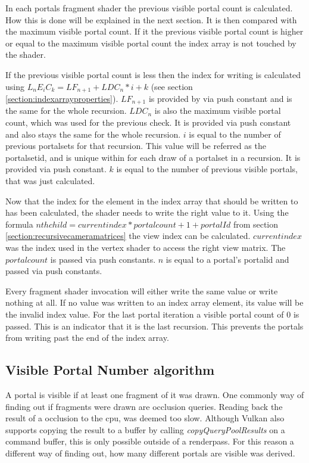 In each portals fragment shader the previous visible portal count is calculated. How this is done will be explained in the next section. It is then compared with the maximum visible portal count. If it the previous visible portal count is higher or equal to the maximum visible portal count the index array is not touched by the shader.

If the previous visible portal count is less then the index for writing is calculated using $L_nE_iC_k = LF_{n+1} + LDC_{n} * i + k$ (see section \ref{section:indexarrayproperties}). $LF_{n+1}$ is provided by via push constant and is the same for the whole recursion.  $LDC_{n}$ is also the maximum visible portal count, which was used for the previous check. It is provided via push constant and also stays the same for the whole recursion. $i$ is equal to the number of previous \glspl{portalset} for that recursion. This value will be referred as the \gls{portalsetid}, and is unique within for each draw of a \gls{portalset} in a recursion. It is provided via push constant. $k$ is equal to the number of previous visible portals, that was just calculated.

Now that the index for the element in the index array that should be written to has been calculated, the shader needs to write the right value to it. Using the formula  $ nth child = current index * portalcount + 1 + portalId$ from section \ref{section:recursivecameramatrices} the view index can be calculated.  $currentindex$ was the index used in the vertex shader to access the right view matrix. The $portalcount$ is passed via push constants. $n$ is equal to a portal's \gls{portalid} and passed via push constants.

Every fragment shader invocation will either write the same value or write nothing at all. If no value was written to an index array element, its value will be the invalid index value. For the last portal iteration a visible portal count of 0 is passed. This is an indicator that it is the last recursion. This prevents the portals from writing past the end of the index array.

\subsection{Visible Portal Number algorithm}
\label{section:visibleportalcount}
A portal is visible if at least one fragment of it was drawn. One commonly way of finding out if fragments were drawn are occlusion queries. Reading back the result of a occlusion to the \gls{cpu}, was deemed too slow. Although Vulkan also supports copying the result to a buffer by calling \textit{copyQueryPoolResults} on a command buffer, this is only possible outside of a renderpass. For this reason a different way of finding out, how many different portals are visible was derived.


